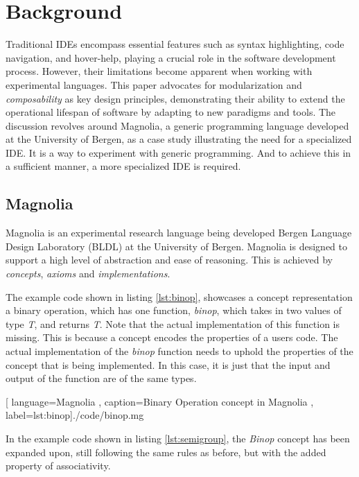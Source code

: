 \chapter{Background}

Traditional IDEs encompass essential features such as syntax highlighting, code
navigation, and hover-help, playing a crucial role in the software development
process. However, their limitations become apparent when working with
experimental languages. This paper advocates for modularization and
\textit{composability} as key design principles, demonstrating their ability to
extend the operational lifespan of software by adapting to new paradigms and
tools. The discussion revolves around Magnolia, a generic programming language
developed at the University of Bergen, as a case study illustrating the need for
a specialized IDE. It is a way to experiment with generic programming. And to
achieve this in a sufficient manner, a more specialized IDE is required.

\section{Magnolia}

Magnolia is an experimental research language being developed Bergen Language
Design Laboratory (BLDL) at the University of Bergen. Magnolia is designed to support
a high level of abstraction and ease of reasoning. This is achieved by
\textit{concepts}, \textit{axioms} and \textit{implementations}.

The example code shown in listing \ref{lst:binop}, showcases a concept
representation a binary operation, which has one function, \textit{binop}, which
takes in two values of type \textit{T}, and returns \textit{T}. Note that the
actual implementation of this function is missing. This is because a concept
encodes the properties of a users code. The actual implementation of the
\textit{binop} function needs to uphold the properties of the concept that is
being implemented. In this case, it is just that the input and output
of the function are of the same types.

\begin{center}
  
    [ language=Magnolia
    , caption={Binary Operation concept in Magnolia}
    , label=lst:binop]{./code/binop.mg}
\end{center}

In the example code shown in listing \ref{lst:semigroup}, the \textit{Binop}
concept has been expanded upon, still following the same rules as before, but
with the added property of associativity.

